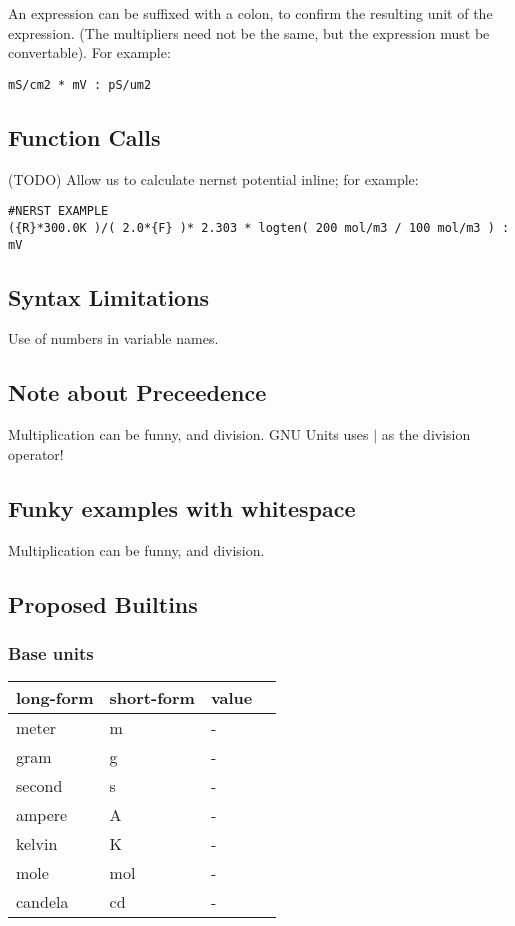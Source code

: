\documentclass{article}
\begin{document}
An expression can be suffixed with a colon, to confirm the resulting unit of the expression. (The multipliers need not be the same, but the expression must be convertable). For example:
\begin{verbatim}
mS/cm2 * mV : pS/um2 
\end{verbatim}


\subsection{Function Calls}
(TODO)
Allow us to calculate nernst potential inline; for example:
\begin{verbatim}
#NERST EXAMPLE
({R}*300.0K )/( 2.0*{F} )* 2.303 * logten( 200 mol/m3 / 100 mol/m3 ) : mV
\end{verbatim}


\subsection{Syntax Limitations}
Use of numbers in variable names.

\subsection*{Note about Preceedence}
Multiplication can be funny, and division.
GNU Units uses $|$ as the division operator!

\subsection*{Funky examples with whitespace}
Multiplication can be funny, and division.


\newpage
\subsection{Proposed Builtins}




\subsubsection{Base units}

\begin{center}
    \begin{tabular}{ | l | l |  l | p{5cm} |}
    \hline
    long-form & short-form & value  \\ \hline
    meter & m & - \\ \hline
    gram & g & - \\ \hline
    second & s & - \\ \hline
    ampere & A & - \\ \hline
    kelvin & K & - \\ \hline
    mole & mol & - \\ \hline
    candela & cd & - \\ \hline
    \end{tabular}
\end{center}
\end{document}
